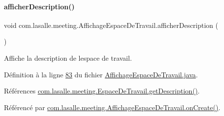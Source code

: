\mbox{\label{classcom_1_1lasalle_1_1meeting_1_1_affichage_espace_de_travail_a4afb30e3faf37f738f6261fc0696d62b}} 
\paragraph{\texorpdfstring{afficher\+Description()}{afficherDescription()}}
{\footnotesize\ttfamily void com.\+lasalle.\+meeting.\+Affichage\+Espace\+De\+Travail.\+afficher\+Description (\begin{DoxyParamCaption}{ }\end{DoxyParamCaption})}



Affiche la description de l\textquotesingle{}espace de travail. 



Définition à la ligne \hyperlink{_affichage_espace_de_travail_8java_source_l00083}{83} du fichier \hyperlink{_affichage_espace_de_travail_8java_source}{Affichage\+Espace\+De\+Travail.\+java}.



Références \hyperlink{_espace_de_travail_8java_source_l00097}{com.\+lasalle.\+meeting.\+Espace\+De\+Travail.\+get\+Description()}.



Référencé par \hyperlink{_affichage_espace_de_travail_8java_source_l00041}{com.\+lasalle.\+meeting.\+Affichage\+Espace\+De\+Travail.\+on\+Create()}.


